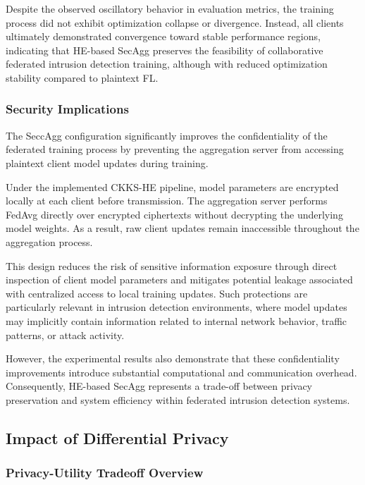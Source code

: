 \documentclass[conference]{IEEEtran}
\begin{document}
Despite the observed oscillatory behavior in evaluation metrics, the training process did not exhibit optimization collapse or divergence. Instead, all clients ultimately demonstrated convergence toward stable performance regions, indicating that HE-based SecAgg preserves the feasibility of collaborative federated intrusion detection training, although with reduced optimization stability compared to plaintext FL.

\subsubsection{Security Implications}

The SeccAgg configuration significantly improves the confidentiality of the federated training process by preventing the aggregation server from accessing plaintext client model updates during training.

Under the implemented CKKS-HE pipeline, model parameters are encrypted locally at each client before transmission. The aggregation server performs FedAvg directly over encrypted ciphertexts without decrypting the underlying model weights. As a result, raw client updates remain inaccessible throughout the aggregation process.

This design reduces the risk of sensitive information exposure through direct inspection of client model parameters and mitigates potential leakage associated with centralized access to local training updates. Such protections are particularly relevant in intrusion detection environments, where model updates may implicitly contain information related to internal network behavior, traffic patterns, or attack activity.

However, the experimental results also demonstrate that these confidentiality improvements introduce substantial computational and communication overhead. Consequently, HE-based SecAgg represents a trade-off between privacy preservation and system efficiency within federated intrusion detection systems.

\subsection{Impact of Differential Privacy}

\subsubsection{Privacy-Utility Tradeoff Overview}
\end{document}
